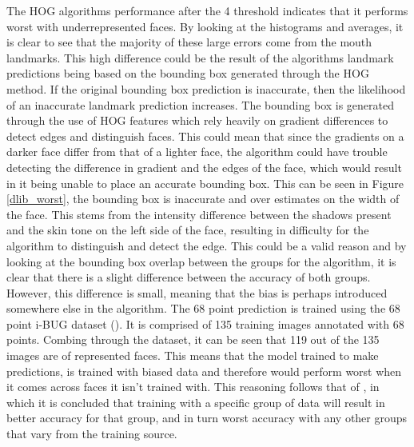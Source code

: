 \documentclass{l4proj}
\begin{document}
The HOG algorithms performance after the 4 threshold indicates that it performs worst with underrepresented faces. By looking at the histograms and averages, it is clear to see that the majority of these large errors come from the mouth landmarks. This high difference could be the result of the algorithms landmark predictions being based on the bounding box generated through the HOG method. If the original bounding box prediction is inaccurate, then the likelihood of an inaccurate landmark prediction increases. The bounding box is generated through the use of HOG features which rely heavily on gradient differences to detect edges and distinguish faces. This could mean that since the gradients on a darker face differ from that of a lighter face, the algorithm could have trouble detecting the difference in gradient and the edges of the face, which would result in it being unable to place an accurate bounding box. This can be seen in Figure \ref{dlib_worst}, the bounding box is inaccurate and over estimates on the width of the face. This stems from the intensity difference between the shadows present and the skin tone on the left side of the face, resulting in difficulty for the algorithm to distinguish and detect the edge. This could be a valid reason and by looking at the bounding box overlap between the groups for the algorithm, it is clear that there is a slight difference between the accuracy of both groups. However, this difference is small, meaning that the bias is perhaps introduced somewhere else in the algorithm. The 68 point prediction is trained using the 68 point i-BUG dataset (\cite{300w}). It is comprised of 135 training images annotated with 68 points. Combing through the dataset, it can be seen that 119 out of the 135 images are of represented faces. This means that the model trained to make predictions, is trained with biased data and therefore would perform worst when it comes across faces it isn't trained with. This reasoning follows that of \cite{prideorpre}, in which it is concluded that training with a specific group of data will result in better accuracy for that group, and in turn worst accuracy with any other groups that vary from the training source.
\end{document}
